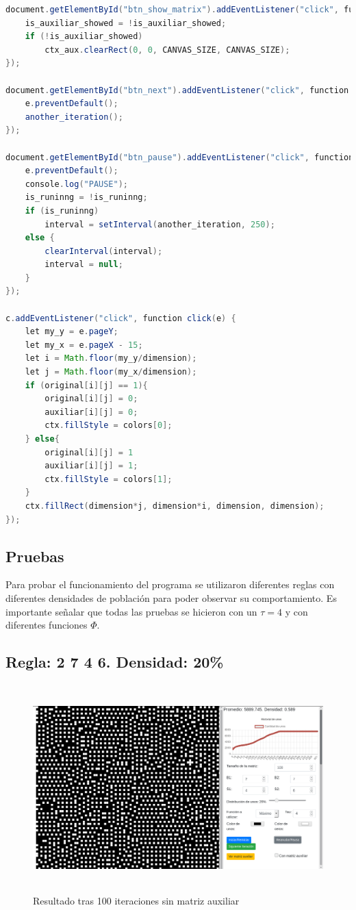 \documentclass[12pt, titlepage]{article}
\begin{document}
\begin{lstlisting}[language=Java]
document.getElementById("btn_show_matrix").addEventListener("click", function click(e) {
    is_auxiliar_showed = !is_auxiliar_showed;
    if (!is_auxiliar_showed)
        ctx_aux.clearRect(0, 0, CANVAS_SIZE, CANVAS_SIZE);
});

document.getElementById("btn_next").addEventListener("click", function click(e) {
    e.preventDefault();
    another_iteration();
});

document.getElementById("btn_pause").addEventListener("click", function click(e) {
    e.preventDefault();
    console.log("PAUSE");
    is_runinng = !is_runinng;
    if (is_runinng)
        interval = setInterval(another_iteration, 250);
    else {
        clearInterval(interval);
        interval = null;
    }
});

c.addEventListener("click", function click(e) {
    let my_y = e.pageY;
    let my_x = e.pageX - 15;
    let i = Math.floor(my_y/dimension);
    let j = Math.floor(my_x/dimension);
    if (original[i][j] == 1){
        original[i][j] = 0;
        auxiliar[i][j] = 0;
        ctx.fillStyle = colors[0];
    } else{
        original[i][j] = 1
        auxiliar[i][j] = 1;
        ctx.fillStyle = colors[1];
    }
    ctx.fillRect(dimension*j, dimension*i, dimension, dimension);
});
\end{lstlisting}

\subsection{Pruebas}
Para probar el funcionamiento del programa se utilizaron diferentes reglas con diferentes densidades de población para poder observar su comportamiento. Es importante señalar que todas las pruebas se hicieron con un $\tau=4$ y con diferentes funciones $\Phi$.

\subsection{Regla: 2 7 4 6. Densidad: 20\%}

\begin{figure}[H]
\begin{center}
 \includegraphics[width=15cm, height=8cm]{./img/2746.png}
 \caption{Resultado tras 100 iteraciones sin matriz auxiliar}
 \label{fig:2746}
\end{center}
\end{figure}
\end{document}
